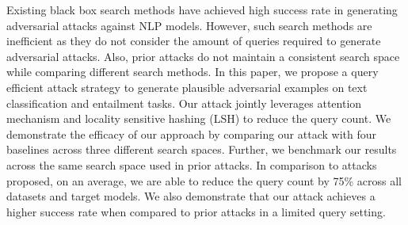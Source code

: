 Existing black box search methods have achieved high success rate in generating adversarial attacks against NLP models. However, such search methods are inefficient as they do not consider the amount of queries required to generate adversarial attacks. Also, prior attacks do not maintain a consistent search space while comparing different search methods. In this paper, we propose a query efficient attack strategy to generate plausible adversarial examples on text classification and entailment tasks. Our attack jointly leverages attention mechanism and locality sensitive hashing (LSH) to reduce the query count. We demonstrate the efficacy of our approach by comparing our attack with four baselines across three different search spaces. Further, we benchmark our results across the same search space used in prior attacks. In comparison to attacks proposed, on an average, we are able to reduce the query count by 75\% across all datasets and target models. We also demonstrate that our attack achieves a higher success rate when compared to prior attacks in a limited query setting.
